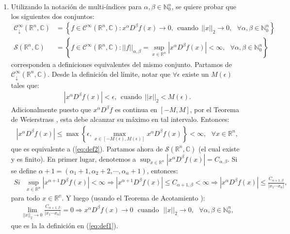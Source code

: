 \documentclass[spanish, fleqn]{article}
\begin{document}
\begin{description}
\begin{enumerate}
		\item Utilizando la notación de multi-índices para $\alpha,\beta \in \mathbb{N}_0^n$, se quiere probar que los siguientes dos conjuntos:
		\begin{align}
			\mathcal{C}_{\downarrow}^{\infty}(\mathbb{R}^n,\mathbb{C}) &= \left\{ f \in \mathcal{C}^{\infty}(\mathbb{R}^n,\mathbb{C}): x^{\alpha} D^{\beta} f(x) \rightarrow 0, \ \ \text{cuando} \ \ ||x||_2 \rightarrow 0, \ \ \ \forall \alpha,\beta \in \mathbb{N}_0^n \right\} \label{eq:def1} \\
			\mathcal{S}(\mathbb{R}^n,\mathbb{C}) &= \left\{ f \in \mathcal{C}^{\infty}(\mathbb{R}^n,\mathbb{C}): ||f ||_{\alpha, \beta} = \sup_{x \in \mathbb{R}^n} \left|x^{\alpha} D^{\beta} f(x)\right| < \infty, \ \ \ \forall \alpha,\beta \in \mathbb{N}_0^n \right\} \label{eq:def2}
		\end{align}
		corresponden a definiciones equivalentes del mismo conjunto. Partamos de $\mathcal{C}_{\downarrow}^{\infty}(\mathbb{R}^n,\mathbb{C})$. Desde la definición del límite, notar que $\forall \epsilon$ existe un $M(\epsilon)$ tales que:
		\begin{align*}
			| x^{\alpha} D^{\beta} f(x)| < \epsilon, \ \ \text{cuando} \ \ ||x||_2 < M(\epsilon).
		\end{align*}
		Adicionalmente puesto que  $x^{\alpha} D^{\beta} f$ es continua en $[-M,M]$, por el Teorema de Weierstrass \cite{Weier}, esta debe alcanzar su máximo en tal intervalo. Entonces:
		\begin{align*}
			|x^{\alpha} D^{\beta} f(x)| \leq \max \left\{ \epsilon, \max_{x\in [-M(\epsilon),M(\epsilon)]} x^{\alpha} D^{\beta} f(x) \right\} < \infty, \ \ \ \forall x \in \mathbb{R}^n,
		\end{align*}
		que es equivalente a (\ref{eq:def2}). Partamos ahora de $\mathcal{S}(\mathbb{R}^n,\mathbb{C})$ (el cual existe y es finito). En primer lugar, denotemos a $\displaystyle \sup_{x \in \mathbb{R}^n} \left|x^{\alpha} D^{\beta} f(x)\right| = C_{\alpha,\beta}$. Si se define $\alpha+1 =(\alpha_1+1, \alpha_2+2, \cdots, \alpha_n+1)$, entonces:
		\begin{align*}
			{Si} \ \ \  \sup_{x \in \mathbb{R}^n} \left|x^{\alpha+1} D^{\beta} f(x)\right| < \infty
			\Rightarrow \left|x^{\alpha+1} D^{\beta} f(x)\right| \leq C_{\alpha+1,\beta} < \infty
			\Rightarrow  \left|x^{\alpha} D^{\beta} f(x)\right| \leq \frac{C_{\alpha+1,\beta}}{|x_1 \cdots x_n|},
		\end{align*}
		para todo $x \in \mathbb{R^n}$. Y luego (usando el Teorema de Acotamiento \cite{Squeeze}):
		\begin{align*}
			\lim_{||x||_2 \rightarrow 0} \frac{C_{\alpha+1,\beta}}{|x_1 \cdots x_n|} = 0 \Longrightarrow x^{\alpha} D^{\beta} f(x)\rightarrow 0 \ \ \ \text{cuando} \ \ \ ||x||_2\rightarrow 0,  \ \ \ \forall \alpha,\beta \in \mathbb{N}_0^n,
		\end{align*}
		que es la la definición en (\ref{eq:def1}).


\end{enumerate}
\end{description}
\end{document}
